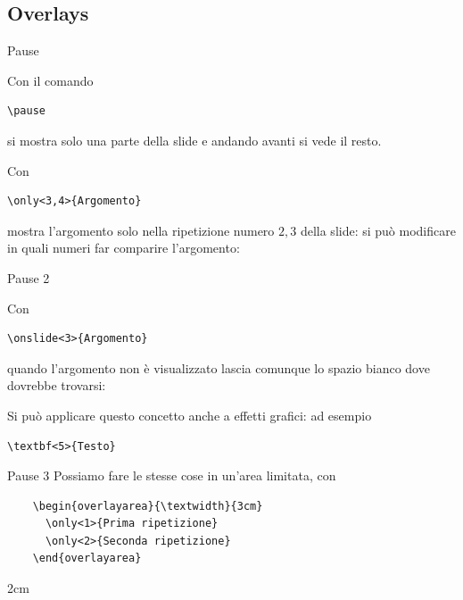 \documentclass[aspectratio=169, compress]{beamer}
\begin{document}
    \subsection{Overlays}
\begin{frame}[fragile]{Pause}
    \begin{block}{}
        Con il comando
        \begin{verbatim}\pause\end{verbatim}
        si mostra solo una parte della slide
        \pause
        e andando avanti si vede il resto.
    \end{block}
    \begin{block}{}
        Con
        \begin{verbatim}\only<3,4>{Argomento}\end{verbatim}
        mostra l'argomento solo nella ripetizione numero $2,3$ della slide: si può modificare in quali numeri far comparire l'argomento:\newline
        \pause
    \end{block}
\end{frame}
\begin{frame}[fragile]{Pause 2}
    \begin{block}{}
        Con
        \begin{verbatim}\onslide<3>{Argomento}\end{verbatim}
        quando l'argomento non è visualizzato lascia comunque lo spazio bianco dove dovrebbe trovarsi:\newline
        \newline
        \pause
    \end{block}
    \begin{block}{}
        Si può applicare questo concetto anche a effetti grafici: ad esempio
        \begin{verbatim}\textbf<5>{Testo}\end{verbatim}
    \end{block}
\end{frame}
\begin{frame}[fragile]{Pause 3}
Possiamo fare le stesse cose in un'area limitata, con
\begin{verbatim}
    \begin{overlayarea}{\textwidth}{3cm}
      \only<1>{Prima ripetizione}
      \only<2>{Seconda ripetizione}
    \end{overlayarea}
\end{verbatim}
\begin{overlayarea}{\textwidth}{2cm}
\end{overlayarea}
\end{frame}
\end{document}
